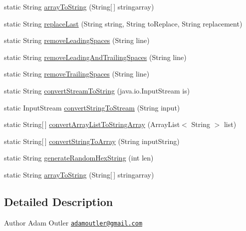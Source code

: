 \begin{DoxyCompactItemize}
\item 
static String \hyperlink{class_c_a_s_u_a_l_1_1misc_1_1_string_operations_a6707927f6d6cc06c8f9bf70e151218d0}{array\-To\-String} (String\mbox{[}$\,$\mbox{]} stringarray)
\item 
static String \hyperlink{class_c_a_s_u_a_l_1_1misc_1_1_string_operations_a2ca54978e1c7207cfc2a5a5526c26e48}{replace\-Last} (String string, String to\-Replace, String replacement)
\item 
static String \hyperlink{class_c_a_s_u_a_l_1_1misc_1_1_string_operations_a917dd1b4316d383992c5eba6c0960934}{remove\-Leading\-Spaces} (String line)
\item 
static String \hyperlink{class_c_a_s_u_a_l_1_1misc_1_1_string_operations_a9e737d317a79c13c3c9ae279fd6c26a8}{remove\-Leading\-And\-Trailing\-Spaces} (String line)
\item 
static String \hyperlink{class_c_a_s_u_a_l_1_1misc_1_1_string_operations_a6e73c975bfeec0c3737203043c72190b}{remove\-Trailing\-Spaces} (String line)
\item 
static String \hyperlink{class_c_a_s_u_a_l_1_1misc_1_1_string_operations_ac656345120c52916e47e2d24f62a8d73}{convert\-Stream\-To\-String} (java.\-io.\-Input\-Stream is)
\item 
static Input\-Stream \hyperlink{class_c_a_s_u_a_l_1_1misc_1_1_string_operations_a813e85c2bd5595496dc70c336d045e53}{convert\-String\-To\-Stream} (String input)
\item 
static String\mbox{[}$\,$\mbox{]} \hyperlink{class_c_a_s_u_a_l_1_1misc_1_1_string_operations_ad37eeeaf74afa6c537486c4103ac07ab}{convert\-Array\-List\-To\-String\-Array} (Array\-List$<$ String $>$ list)
\item 
static String\mbox{[}$\,$\mbox{]} \hyperlink{class_c_a_s_u_a_l_1_1misc_1_1_string_operations_a20b27a70d8a3a625c27001f6a072bf8d}{convert\-String\-To\-Array} (String input\-String)
\item 
static String \hyperlink{class_c_a_s_u_a_l_1_1misc_1_1_string_operations_ad287e81ccf48546cd49738824cbb1a25}{generate\-Random\-Hex\-String} (int len)
\item 
static String \hyperlink{class_c_a_s_u_a_l_1_1misc_1_1_string_operations_a6707927f6d6cc06c8f9bf70e151218d0}{array\-To\-String} (String\mbox{[}$\,$\mbox{]} stringarray)
\end{DoxyCompactItemize}


\subsection{Detailed Description}
\begin{DoxyAuthor}{Author}
Adam Outler \href{mailto:adamoutler@gmail.com}{\tt adamoutler@gmail.\-com} 
\end{DoxyAuthor}


